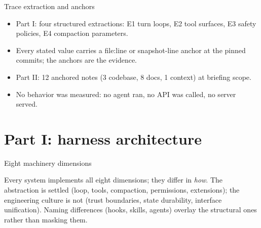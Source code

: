 \documentclass[aspectratio=169,11pt]{beamer}
\begin{document}
\begin{frame}{Trace extraction and anchors}
  \begin{itemize}
    \item Part I: four structured extractions: E1 turn loops, E2 tool
      surfaces, E3 safety policies, E4 compaction parameters.
    \item Every stated value carries a file:line or snapshot-line anchor
      at the pinned commits; the anchors are the evidence.
    \item Part II: 12 anchored notes (3 codebase, 8 docs, 1 context) at
      briefing scope.
    \item No behavior was measured: no agent ran, no API was called, no
      server served.
  \end{itemize}
\end{frame}

\section{Part I: harness architecture}

\begin{frame}{Eight machinery dimensions}
  \begin{center}
  \end{center}
  \vspace{-0.3em}
  Every system implements all eight dimensions; they differ in \emph{how}.
  The abstraction is settled (loop, tools, compaction, permissions,
  extensions); the engineering culture is not (trust boundaries, state
  durability, interface unification). Naming differences (hooks, skills,
  agents) overlay the structural ones rather than masking them.
\end{frame}
\end{document}
